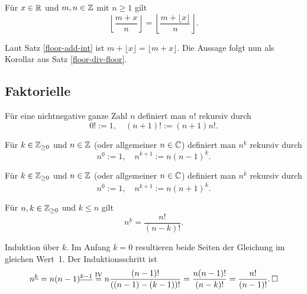 \begin{Satz}
Für $x\in\mathbb R$ und $m,n\in\mathbb Z$ mit $n\ge 1$ gilt
\[\left\lfloor\frac{m+x}{n}\right\rfloor
= \left\lfloor\frac{m+\lfloor x\rfloor}{n}\right\rfloor.\]
\end{Satz}
\begin{Beweis}
Laut Satz \ref{floor-add-int} ist $m+\lfloor x\rfloor = \lfloor m+x\rfloor$.
Die Aussage folgt nun als Korollar aus Satz \ref{floor-div-floor}.\,\qedsymbol
\end{Beweis}

\newpage
\subsection{Faktorielle}

\begin{Definition}[Fakultät]%
\label{def:factorial}\newlinefirst
Für eine nichtnegative ganze Zahl $n$ definiert man $n!$ rekursiv durch
\[0! := 1,\quad (n+1)! := (n+1)n!.\]
\end{Definition}

\begin{Definition}\label{def:falling-factorial}%
\newlinefirst
Für $k\in\mathbb Z_{\ge 0}$ und $n\in\mathbb Z$ (oder allgemeiner $n\in\mathbb C$)
definiert man $n^{\underline k}$ rekursiv durch
\[n^{\underline 0} := 1,\quad n^{\underline {k+1}}:=n(n-1)^{\underline k}.\]
\end{Definition}

\begin{Definition}\label{def:raising-factorial}%
\newlinefirst
Für $k\in\mathbb Z_{\ge 0}$ und $n\in\mathbb Z$ (oder allgemeiner $n\in\mathbb C$)
definiert man $n^{\overline k}$ rekursiv durch
\[n^{\overline 0} := 1,\quad n^{\overline {k+1}}:=n(n+1)^{\overline k}.\]
\end{Definition}

\begin{Satz}\label{relation-ff-factorial}
Für $n,k\in\mathbb Z_{\ge 0}$ und $k\le n$ gilt
\[n^{\underline k} = \frac{n!}{(n-k)!}.\]
\end{Satz}
\begin{Beweis}
Induktion über $k$. Im Anfang $k=0$ resultieren beide Seiten der
Gleichung im gleichen Wert~1. Der Induktionsschritt ist
\[n^{\underline k} = n(n-1)^{\underline{k-1}}
\stackrel{\text{IV}}= n\frac{(n-1)!}{((n-1)-(k-1))!}
= \frac{n(n-1)!}{(n-k)!}
= \frac{n!}{(n-1)!}.\,\square\]
\end{Beweis}

